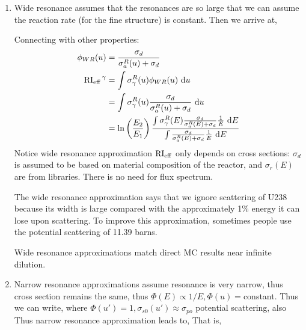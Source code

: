 \documentclass{school-22.211-notes}
\begin{document}

\begin{enumerate}
\item Wide resonance assumes that the resonances are so large that we can assume the reaction rate (for the fine structure) is constant. 
Then we arrive at, 
%


Connecting with other properties:
\begin{align}
\phi_{WR} (u) &= \frac{\sigma_d}{\sigma_{a}^R (u) +  \sigma_d } \\
\left. \mathrm{RI}_{\mathrm{eff}} \right.^{\gamma} &= \int \sigma_{\gamma}^R (u) \phi_{WR} (u) \mbox{ }\mathrm{d} u \\
&= \int \sigma_{\gamma}^R (u) \frac{\sigma_d}{\sigma_a^R(u) + \sigma_d} \mbox{ }\mathrm{d} u \\
&= \ln\left( \frac{E_2}{E_1} \right) \frac{ \int \sigma_{\gamma}^R (E) \frac{\sigma_d}{\sigma_{a}^R(E) + \sigma_d} \frac{1}{E} \mbox{ }\mathrm{d} E}{ \int \frac{\sigma_d}{\sigma_{a}^R(E) + \sigma_d} \frac{1}{E} \mbox{ }\mathrm{d} E}
\end{align}
Notice wide resonance approximation $\mathrm{RI}_{\mathrm{eff}}$ only depends on cross sections: $\sigma_d$ is assumed to be based on material composition of the reactor, and $\sigma_r(E)$ are from libraries. There is no need for flux spectrum. 

The wide resonance approximation says that we ignore scattering of U238 because its width is large compared with the approximately 1\% energy it can lose upon scattering. To improve this approximation, sometimes people use the potential scattering of 11.39 barns. 

Wide resonance approximations match direct MC results near infinite dilution. 




\item Narrow resonance approximations assume resonance is very narrow, thus cross section remains the same, thus $\Phi(E) \propto 1/E, \Phi(u) = $constant. Thus we can write, 
where $\Phi(u') = 1, \sigma_{s0} (u')\approx \sigma_{po}$ potential scattering, also 
Thus narrow resonance approximation leads to, 
That is, 





\end{enumerate}
\end{document}
